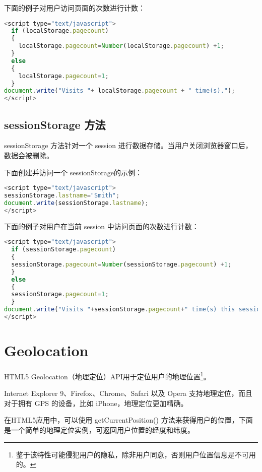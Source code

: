下面的例子对用户访问页面的次数进行计数：


\begin{lstlisting}[language=JavaScript]
<script type="text/javascript">
  if (localStorage.pagecount)
  {
    localStorage.pagecount=Number(localStorage.pagecount) +1;
  }
  else
  {
    localStorage.pagecount=1;
  }
document.write("Visits "+ localStorage.pagecount + " time(s).");
</script>
\end{lstlisting}



\subsection{sessionStorage 方法}

sessionStorage 方法针对一个 session 进行数据存储。当用户关闭浏览器窗口后，数据会被删除。


下面创建并访问一个 sessionStorage的示例：

\begin{lstlisting}[language=JavaScript]
<script type="text/javascript">
sessionStorage.lastname="Smith";
document.write(sessionStorage.lastname);
</script>
\end{lstlisting}

下面的例子对用户在当前 session 中访问页面的次数进行计数：

\begin{lstlisting}[language=JavaScript]
<script type="text/javascript">
  if (sessionStorage.pagecount)
  {
  sessionStorage.pagecount=Number(sessionStorage.pagecount) +1;
  }
  else
  {
  sessionStorage.pagecount=1;
  }
document.write("Visits "+sessionStorage.pagecount+" time(s) this session.");
</script>
\end{lstlisting}




\section{Geolocation}


HTML5 Geolocation（地理定位）API用于定位用户的地理位置\footnote{鉴于该特性可能侵犯用户的隐私，除非用户同意，否则用户位置信息是不可用的。}。


Internet Explorer 9、Firefox、Chrome、Safari 以及 Opera 支持地理定位，而且对于拥有 GPS 的设备，比如 iPhone，地理定位更加精确。

在HTML5应用中，可以使用 getCurrentPosition() 方法来获得用户的位置，下面是一个简单的地理定位实例，可返回用户位置的经度和纬度。


